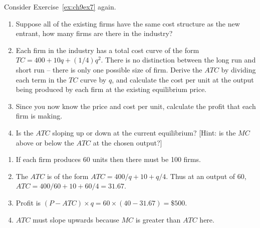 \begin{enumialphparenastyle}
\begin{ex}\label{ex:ch9ex8}
Consider Exercise~\ref{ex:ch9ex7} again.
\begin{enumerate}
	\item	Suppose all of the existing firms have the same cost structure as the new entrant, how many firms are there in the industry?
	\item	Each firm in the industry has a total cost curve of the form $TC=400+10q+(1/4)q^2$. There is no distinction between the long run and short run -- there is only one possible size of firm. Derive the $ATC$ by dividing each term in the $TC$ curve by $q$, and calculate the cost per unit at the output being produced by each firm at the existing equilibrium price. 
	\item	Since you now know the price and cost per unit, calculate the profit that each firm is making.
	\item	Is the $ATC$ sloping up or down at the current equilibrium? [Hint: is the $MC$ above or below the $ATC$ at the chosen output?]
\end{enumerate}
\begin{sol}
\begin{enumerate}
	\item	If each firm produces 60 units then there must be 100 firms.
	\item	The $ATC$ is of the form $ATC=400/q+10+q/4$. Thus at an output of 60, $ATC=400/60+10+60/4=31.67$.
	\item	Profit is $(P-ATC)\times q=60\times (40-31.67)=\$500$.
	\item	$ATC$ must slope upwards because $MC$ is greater than $ATC$ here. 
\end{enumerate}
\end{sol}
\end{ex}


\end{enumialphparenastyle}
